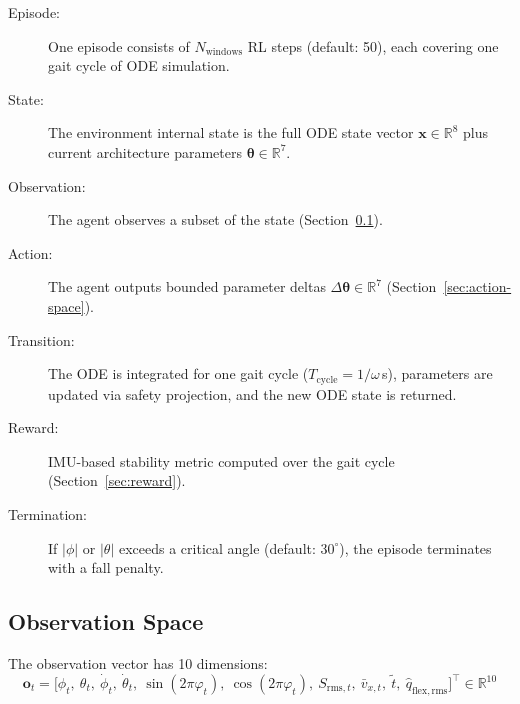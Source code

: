 \documentclass[11pt]{article}
\begin{document}
\begin{description}
    \item[Episode:] One episode consists of $N_{\mathrm{windows}}$ RL steps (default: 50), each covering one gait cycle of ODE simulation.
    \item[State:] The environment internal state is the full ODE state vector $\mathbf{x}\in\mathbb{R}^8$ plus current architecture parameters $\boldsymbol{\theta}\in\mathbb{R}^7$.
    \item[Observation:] The agent observes a subset of the state (Section~\ref{sec:obs-space}).
    \item[Action:] The agent outputs bounded parameter deltas $\Delta\boldsymbol{\theta}\in\mathbb{R}^7$ (Section~\ref{sec:action-space}).
    \item[Transition:] The ODE is integrated for one gait cycle ($T_{\mathrm{cycle}} = 1/\omega$\,s), parameters are updated via safety projection, and the new ODE state is returned.
    \item[Reward:] IMU-based stability metric computed over the gait cycle (Section~\ref{sec:reward}).
    \item[Termination:] If $|\phi|$ or $|\theta|$ exceeds a critical angle (default: $30^\circ$), the episode terminates with a fall penalty.
\end{description}

\subsection{Observation Space}
\label{sec:obs-space}

The observation vector has 10 dimensions:
\begin{equation}
\mathbf{o}_t = \bigl[\phi_t,\ \theta_t,\ \dot\phi_t,\ \dot\theta_t,\ \sin(2\pi\varphi_t),\ \cos(2\pi\varphi_t),\ S_{\mathrm{rms},t},\ \bar{v}_{x,t},\ \tilde{t},\ \hat{q}_{\mathrm{flex,rms}}\bigr]^\top \in \mathbb{R}^{10}
\label{eq:obs}
\end{equation}
\end{document}
